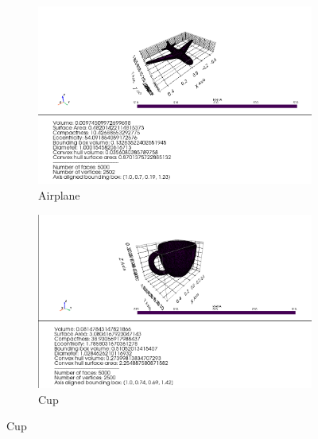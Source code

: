 \begin{figure}[ht!p]
    \centering
    \begin{subfigure}[b]{0.45\textwidth}
        \includegraphics[width=\textwidth]{assets/feature_extraction/scalar_features/airplane.png}
        \caption{Airplane}
        \label{fig:airplane-scalars}
    \end{subfigure}
    \hfill
    \begin{subfigure}[b]{0.45\textwidth}
        \includegraphics[width=\textwidth]{assets/feature_extraction/scalar_features/cup.png}
        \caption{Cup}
        \label{fig:cup-scalars}
    \end{subfigure}
    \hfill
    

\end{figure}
